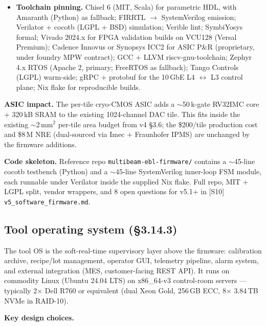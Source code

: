 \documentclass[11pt,letterpaper]{article}
\begin{document}
\begin{itemize}[leftmargin=1.6em]
  \item \textbf{Toolchain pinning.} Chisel 6 (MIT, Scala) for parametric HDL, with Amaranth (Python) as fallback; FIRRTL $\to$ SystemVerilog emission; Verilator + cocotb (LGPL + BSD) simulation; Verible lint; SymbiYosys formal; Vivado 2024.x for FPGA validation builds on VCU128 (Versal Premium); Cadence Innovus or Synopsys ICC2 for ASIC P\&R (proprietary, under foundry MPW contract); GCC + LLVM riscv-gnu-toolchain; Zephyr 4.x RTOS (Apache 2, primary; FreeRTOS as fallback); Tango Controls (LGPL) warm-side; gRPC + protobuf for the 10\,GbE L4 $\leftrightarrow$ L3 control plane; Nix flake for reproducible builds.
\end{itemize}

\textbf{ASIC impact.} The per-tile cryo-CMOS ASIC adds a $\sim$50\,k-gate RV32IMC core + 320\,kB SRAM to the existing 1024-channel DAC tile. This fits inside the existing $\sim$2\,mm$^2$ per-tile area budget from v4 \S 3.6; the \$200/tile production cost and \$8\,M NRE (dual-sourced via Imec + Fraunhofer IPMS) are unchanged by the firmware additions.

\textbf{Code skeleton.} Reference repo \texttt{multibeam-ebl-firmware/} contains a $\sim$45-line cocotb testbench (Python) and a $\sim$45-line SystemVerilog inner-loop FSM module, each runnable under Verilator inside the supplied Nix flake. Full repo, MIT + LGPL split, vendor wrappers, and 8 open questions for v5.1+ in [S10] \texttt{v5\_software\_firmware.md}.

\subsection{Tool operating system (\S 3.14.3)}

The tool OS is the soft-real-time supervisory layer above the firmware: calibration archive, recipe/lot management, operator GUI, telemetry pipeline, alarm system, and external integration (MES, customer-facing REST API). It runs on commodity Linux (Ubuntu 24.04 LTS) on x86\_64-v3 control-room servers --- typically 2$\times$ Dell R760 or equivalent (dual Xeon Gold, 256\,GB ECC, 8$\times$ 3.84\,TB NVMe in RAID-10).

\textbf{Key design choices.}
\end{document}
